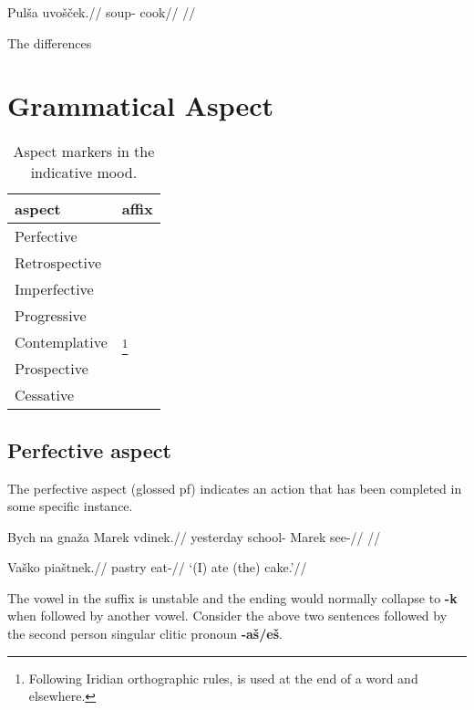 \pex
\begingl
\gla Pul\v{s}a uvo\v{s}\v{c}ek.//
\glb soup- cook//
\glft {}//
\endgl
\xe


\par The differences

\section{Grammatical Aspect}
\begin{table}[h!]
	\footnotesize\sffamily
	\caption{Aspect markers in the indicative mood.}
	\begin{tabu} to 0.5\textwidth{YY[0.5]}
		\toprule
		{\sc aspect}	& {\sc affix}\\
		\midrule
		Perfective		& \\
		Retrospective	& \\
		Imperfective	& \\
		Progressive		&  \\
		Contemplative	& \footnote{Following Iridian orthographic rules,  is used at the end of a word and  elsewhere.}\\
		Prospective		& \\
		Cessative		& \\
		\bottomrule
	\end{tabu}

\end{table}
\subsection{Perfective aspect}
The perfective aspect (glossed {\sc pf}) indicates an action that has been completed in some specific instance.

\pex
\begingl
\gla Bych na gna\v{z}a Marek vdinek.//
\glb yesterday  school- Marek see-//
\glft {}//
\endgl
\xe

\pex
\begingl
\gla Va\v{s}ko pia\v{s}tnek.//
\glb pastry eat-//
\glft `(I) ate (the) cake.'//
\endgl
\xe

\par The vowel in the suffix is unstable and the ending would normally collapse to \textbf{-k} when followed by another vowel. Consider the above two sentences followed by the second person singular clitic pronoun \textbf{-a\v{s}/e\v{s}}.

